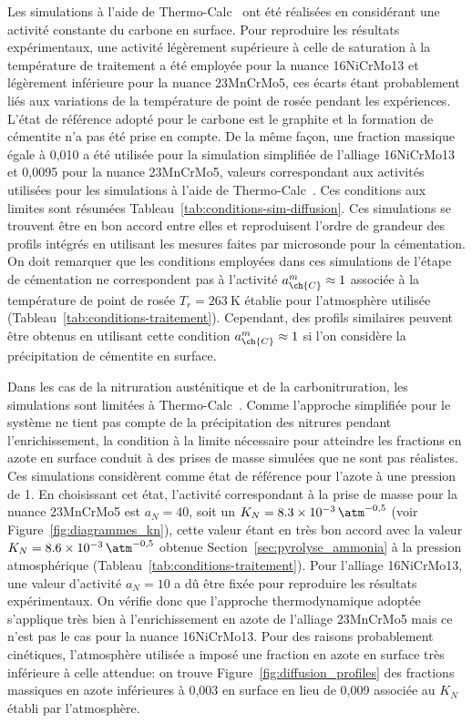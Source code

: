 Les simulations à l'aide de Thermo-Calc~\cite{Andersson2002,Borgenstam2000} ont été réalisées en considérant une activité constante du carbone en surface. Pour reproduire les résultats expérimentaux, une activité légèrement supérieure à celle de saturation à la température de traitement a été employée pour la nuance 16NiCrMo13 et légèrement inférieure pour la nuance 23MnCrMo5, ces écarts étant probablement liés aux variations de la température de point de rosée pendant les expériences. L'état de référence adopté pour le carbone est le graphite et la formation de cémentite n'a pas été prise en compte. De la même façon, une fraction massique égale à 0,010 a été utilisée pour la simulation simplifiée de l'alliage 16NiCrMo13 et 0,0095 pour la nuance 23MnCrMo5, valeurs correspondant aux activités utilisées pour les simulations à l'aide de Thermo-Calc~\cite{Andersson2002,Borgenstam2000}. Ces conditions aux limites sont résumées Tableau~\ref{tab:conditions-sim-diffusion}. Ces simulations se trouvent être en bon accord entre elles et reproduisent l'ordre de grandeur des profils intégrés en utilisant les mesures faites par microsonde pour la cémentation. On doit remarquer que les conditions employées dans ces simulations de l'étape de cémentation ne correspondent pas à l'activité $a_{\ch{C}}^{m}\approx{}1$ associée à la température de point de rosée $T_{r}=\SI{263}{\kelvin}$ établie pour l'atmosphère utilisée (Tableau~\ref{tab:conditions-traitement}). Cependant, des profils similaires peuvent être obtenus en utilisant cette condition $a_{\ch{C}}^{m}\approx{}1$ si l'on considère la précipitation de cémentite en surface.

Dans les cas de la nitruration austénitique et de la carbonitruration, les simulations sont limitées à Thermo-Calc~\cite{Andersson2002,Borgenstam2000}. Comme l'approche simplifiée pour le système  ne tient pas compte de la précipitation des nitrures pendant l'enrichissement, la condition à la limite nécessaire pour atteindre les fractions en azote en surface conduit à des prises de masse simulées que ne sont pas réalistes. Ces simulations considèrent comme état de référence pour l'azote  à une pression de \SI{1}{\atm}. En choisissant cet état, l'activité correspondant à la prise de masse pour la nuance 23MnCrMo5 est $a_{N}=40$, soit un $K_{N}=\SI{8,3E-3}{\atm^{-0,5}}$ (voir Figure~\ref{fig:diagrammes_kn}), cette valeur étant en très bon accord avec la valeur $K_{N}=\SI{8,6E-3}{\atm^{-0,5}}$ obtenue Section~\ref{sec:pyrolyse_ammonia} à la pression atmosphérique (Tableau~\ref{tab:conditions-traitement}). Pour l'alliage 16NiCrMo13, une valeur d'activité $a_{N}=10$ a dû être fixée pour reproduire les résultats expérimentaux. On vérifie donc que l'approche thermodynamique adoptée s'applique très bien à l'enrichissement en azote de l'alliage 23MnCrMo5 mais ce n'est pas le cas pour la nuance 16NiCrMo13. Pour des raisons probablement cinétiques, l'atmosphère utilisée a imposé une fraction en azote en surface très inférieure à celle attendue: on trouve Figure~\ref{fig:diffusion_profiles} des fractions massiques en azote inférieures à 0,003 en surface en lieu de 0,009 associée au $K_{N}$ établi par l'atmosphère. 

